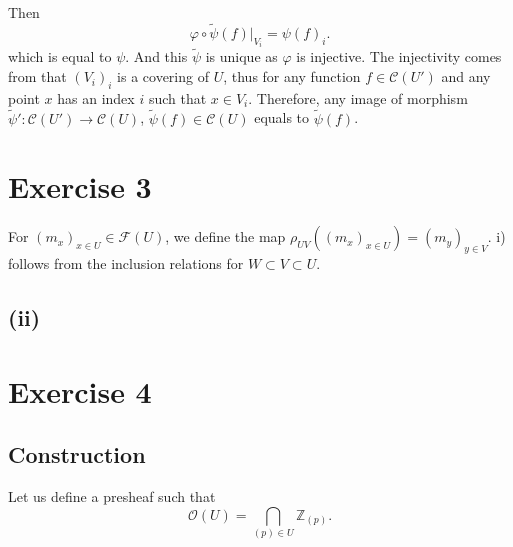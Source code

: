 \documentclass{article}
\begin{document}
Then 
\begin{equation*}
\varphi\circ\tilde{\psi}(f)|_{V_i} = \psi(f)_i.
\end{equation*}
which is equal to $\psi$. And this $\tilde{\psi}$ is unique as $\varphi$ is injective. The injectivity comes from that $(V_i)_i$ is a covering of $U$, thus for any function $f\in\mathcal{C}(U')$ and any point $x$ has an index $i$ such that $x\in V_i$. Therefore, any image of morphism $\tilde{\psi}':\mathcal{C}(U')\to\mathcal{C}(U)$, $\tilde{\psi}(f)\in\mathcal{C}(U)$ equals to $\tilde{\psi}(f)$.


\section*{Exercise 3}

For $(m_x)_{x\in U}\in\mathcal{F}(U)$, we define the map $\rho_{UV}((m_x)_{x\in U}) = (m_y)_{y\in V}$. i) follows from the inclusion relations for $W\subset V\subset U$. 

\subsection*{(ii)}



\section*{Exercise 4}

\subsection*{Construction}
Let us define a presheaf such that
\begin{equation*}
\mathcal{O}(U) = \bigcap_{(p)\in U} \mathbb{Z}_{(p)}.
\end{equation*}
\end{document}

